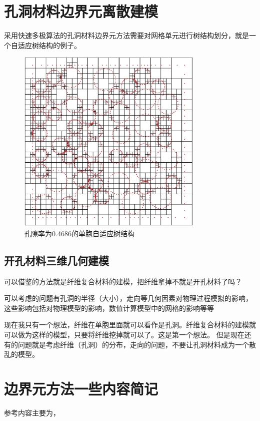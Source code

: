 \section{孔洞材料边界元离散建模}
采用快速多极算法的孔洞材料边界元方法需要对网格单元进行树结构划分，就是一个自适应树结构的例子。
\begin{figure}[htbp]
	\begin{center}
		\includegraphics[width=0.8\textwidth]{pics/vf0.4686.eps}
	\end{center}
	\caption{孔隙率为0.4686的单胞自适应树结构}
	\label{fig:porous0_4686}
\end{figure}

\subsection{开孔材料三维几何建模}

可以借鉴的方法就是纤维复合材料的建模，把纤维拿掉不就是开孔材料了吗？

可以考虑的问题有孔洞的半径（大小），走向等几何因素对物理过程模拟的影响，
这些影响包括对物理模型的影响，数值计算模型中的网格的影响等等

现在我只有一个想法，纤维在单胞里面就可以看作是孔洞。纤维复合材料的建模就可以做为这样的模型，只要将纤维挖掉就可以了。这是第一个想法。
但是现在还有的问题就是考虑纤维（孔洞）的分布，走向的问题，不要让孔洞材料成为一个散乱的模型。
\newpage
\section{边界元方法一些内容简记}
参考内容主要为\cite{zhu1991,zhu2009}，
